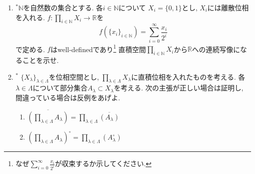 \documentclass[dvipdfmx,a4paper,11pt]{article}
\newcommand{\R}{\mathbb{R}}
\newcommand{\N}{\mathbb{N}}
\theoremstyle{definition}
\begin{document}
\begin{enumerate}[ label=\textbf{問}\ref*{sec-product}.\arabic*]


\item $^{*}$$\N$を自然数の集合とする. 各$i \in \N$について $X_{i} = \{ 0,1\}$とし, $X_i$には離散位相を入れる.
$f :\prod_{i \in \N} X_{i} \rightarrow \R$を
$$
f (\{ x_i\}_{i \in \N}) = \sum_{i=0}^{\infty} \frac{x_i}{2^i}
$$
で定める. $f$はwell-definedであり\footnote{なぜ$\sum_{i=0}^{\infty} \frac{x_i}{2^i}$が収束するか示してください.} 
直積空間$\prod_{i \in \N} X_{i}$から$\R$への連続写像になることを示せ.



\item $^{*}$  $\{ X_\lambda \}_{\lambda \in \Lambda}$を位相空間とし, $\prod_{\lambda \in \Lambda} X_{\lambda} $に直積位相を入れたものを考える. 
各$\lambda \in \Lambda$について部分集合$A_{\lambda} \subset X_{\lambda}$を考える.  次の主張が正しい場合は証明し, 間違っている場合は反例をあげよ.
	\begin{enumerate}
		\setlength{\parskip}{0cm} 
  \setlength{\itemsep}{0pt} 
	\item $\overline{(\prod_{\lambda \in \Lambda} A_{\lambda})} =\prod_{\lambda \in \Lambda} \overline{(A_{\lambda})}$
	\item $(\prod_{\lambda \in \Lambda} A_{\lambda})^\circ=\prod_{\lambda \in \Lambda} (A_{\lambda}^\circ)$
	\end{enumerate}
	
\begin{comment}

\item $^{*}$ $[0,1]$上の実数値連続関数の集合$C([0,1])$とその距離$d_{\infty}$を\ref{conti}の通りとする.  $x \in [0,1]$について$X_x = \R$とおくことで, 
$C[0,1] \subset \prod_{x \in [0,1]} X_{x}$とみなせる. そこで$\prod_{x \in [0,1]} X_{x}$の積位相の$C[0,1]$への相対位相を$\mathscr{U}_W$とおく. 次の問いに答えよ.
\begin{enumerate}
\setlength{\parskip}{0cm}
  \setlength{\itemsep}{0pt} 
\item 関数列$\{ f_{i}\}_{i=1}^{\infty}$が$f \in C[0,1]$に各点収束することは, 位相空間$(C[0,1], \mathscr{U}_W)$において$\{ f_{i}\}_{i=1}^{\infty}$が$f \in C[0,1]$に収束することと同値であることを示せ. (後者の収束の定義に関しては\ref{pointwise}を参照せよ.)
\item $\mathscr{U}_p$は距離空間$(C[0,1],d_{\infty})$が作る位相$\mathscr{U}_{\infty}$よりも真に小さい, つまり$\mathscr{U}_W\subsetneq \mathscr{U}_{\infty}$であることを示せ.%
\end{enumerate}
\end{comment}


\end{enumerate}
\end{document}
